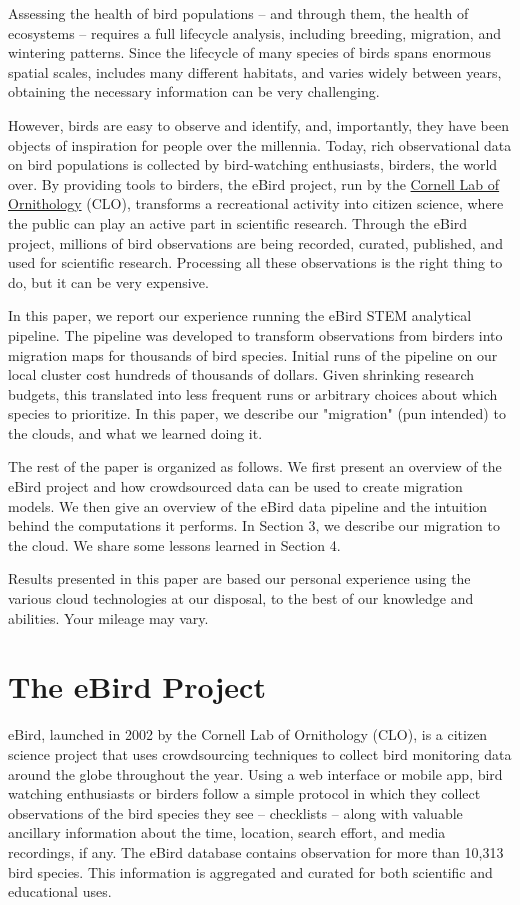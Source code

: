 \documentclass{acm_proc_article-sp}
\begin{document}
Assessing the health of bird populations -- and through them, the health of ecosystems -- requires a full lifecycle analysis, including breeding, migration, and wintering patterns. Since the lifecycle of many species of birds spans enormous spatial scales, includes many different habitats, and varies widely between years, obtaining the necessary information can be very challenging.

However, birds are easy to observe and identify, and, importantly, they have been objects of inspiration for people over the millennia. Today, rich observational data on bird populations is collected by bird-watching enthusiasts, birders, the world over. By providing tools to birders, the eBird project, run by the \href{http://www.birds.cornell.edu/}{Cornell Lab of Ornithology} (CLO), transforms a recreational activity into citizen science, where the public can play an active part in scientific research. Through the eBird project, millions of bird observations are being recorded, curated, published, and used for scientific research. Processing all these observations is the right thing to do, but it can be very expensive.

In this paper, we report our experience running the eBird STEM analytical pipeline. The pipeline was developed to transform observations from birders into migration maps for thousands of bird species. Initial runs of the pipeline on our local cluster cost hundreds of thousands of dollars. Given shrinking research budgets, this translated into less frequent runs or arbitrary choices about which species to prioritize. In this paper, we describe our "migration" (pun intended) to the clouds, and what we learned doing it.

The rest of the paper is organized as follows. We first present an overview of the eBird project and how crowdsourced data can be used to create migration models. We then give an overview of the eBird data pipeline and the intuition behind the computations it performs. In Section 3, we describe our migration to the cloud. We share some lessons learned in Section 4.

Results presented in this paper are based our personal experience using the various cloud technologies at our disposal, to the best of our knowledge and abilities. Your mileage may vary.

\section{The eBird Project}
eBird, launched in 2002 by the Cornell Lab of Ornithology (CLO), is a citizen science project that uses crowdsourcing techniques to collect bird monitoring data around the globe throughout the year. Using a web interface or mobile app, bird watching enthusiasts or birders follow a simple protocol in which they collect observations of the bird species they see -- checklists -- along with valuable ancillary information about the time, location, search effort, and media recordings, if any. The eBird database contains observation for more than 10,313  bird species. This information is aggregated and curated for both scientific and educational uses.
\end{document}
